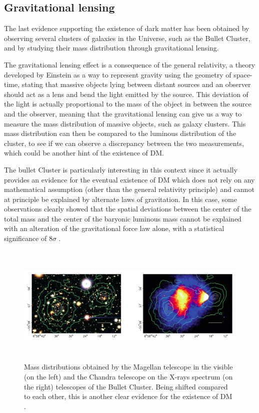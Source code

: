 \documentclass[a4paper, 10pt, openright]{report}
\begin{document}
\subsection{Gravitational lensing}

The last evidence supporting the existence of dark matter has been obtained by observing several clusters of galaxies in the Universe, such as the Bullet Cluster, and by studying their mass distribution through gravitational lensing.

The gravitational lensing effect is a consequence of the general relativity, a theory developed by Einstein as a way to represent gravity using the geometry of space-time, stating that massive objects lying between distant sources and an observer should act as a lens and bend the light emitted by the source. This deviation of the light is actually proportional to the mass of the object in between the source and the observer, meaning that the gravitational lensing can give us a way to measure the mass distribution of massive objects, such as galaxy clusters. This mass distribution can then be compared to the luminous distribution of the cluster, to see if we can observe a discrepancy between the two measurements, which could be another hint of the existence of \ac{DM}.

The bullet Cluster is particularly interesting in this context since it actually provides an evidence for the eventual existence of \ac{DM} which does not rely on any mathematical assumption (other than the general relativity principle) and cannot at principle be explained by alternate laws of gravitation. In this case, some observations clearly showed that the spatial deviations between the center of the total mass and the center of the baryonic luminous mass cannot be explained with an alteration of the gravitational force law alone, with a statistical significance of $8 \sigma$ \cite{BulletClusterSigma}.

\begin{figure}[htbp]
\begin{center}
\includegraphics[width=14.2cm, height=5.8cm]{figs/BulletCluster.png}
\caption{Mass distributions obtained by the Magellan telescope in the visible (on the left) and the Chandra telescope on the X-rays spectrum (on the right) telescopes of the Bullet Cluster. Being shifted compared to each other, this is another clear evidence for the existence of \ac{DM} \cite{BulletClusterSigma}.}
\label{figure:BulletCluster}
\end{center}
\end{figure}
\end{document}
